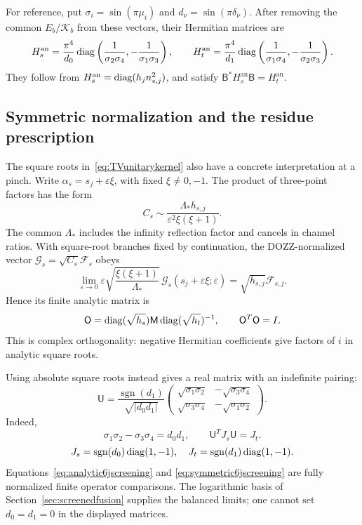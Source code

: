 For reference, put
$\sigma_i=\sin(\pi\mu_i)$ and
$d_\nu=\sin(\pi\delta_\nu)$. After removing the common
$E_b/\mathcal K_b$ from these vectors, their Hermitian matrices
are
\begin{equation}
 H_s^{\mathrm{an}}=
 \frac{\pi^4}{d_0}
 \operatorname{diag}\left(\frac1{\sigma_2\sigma_4},
            -\frac1{\sigma_1\sigma_3}\right),\qquad
 H_t^{\mathrm{an}}=
 \frac{\pi^4}{d_1}
 \operatorname{diag}\left(\frac1{\sigma_1\sigma_4},
            -\frac1{\sigma_2\sigma_3}\right).
 \label{eq:analytic6jpairing}
\end{equation}
They follow from $H_s^{\mathrm{an}}=\operatorname{diag}(h_jn_{s,j}^2)$,
and satisfy $\mathsf B^*H_s^{\mathrm{an}}\mathsf B
=H_t^{\mathrm{an}}$.

\subsection{Symmetric normalization and the residue prescription}

The square roots in~\eqref{eq:TVunitarykernel} also have a
concrete interpretation at a pinch. Write
$\alpha_s=s_j+\varepsilon\xi$, with fixed
$\xi\ne0,-1$. The product of three-point factors has the form
\[
 C_s\sim\frac{\Lambda_*h_{s,j}}
                {\varepsilon^2\xi(\xi+1)}.
\]
The common $\Lambda_*$ includes the infinity reflection factor
and cancels in channel ratios. With square-root branches fixed
by continuation, the DOZZ-normalized vector
$\mathcal G_s=\sqrt{C_s}\mathcal F_s$ obeys
\begin{equation}
 \lim_{\varepsilon\to0}
 \varepsilon\sqrt{\frac{\xi(\xi+1)}{\Lambda_*}}\,
 \mathcal G_s(s_j+\varepsilon\xi;\varepsilon)
       =\sqrt{h_{s,j}}\mathcal F_{s,j}.
 \label{eq:regularizedTVvector}
\end{equation}
Hence its finite analytic matrix is
\[
 \mathsf O=\operatorname{diag}(\sqrt{h_s})\mathsf M
                 \operatorname{diag}(\sqrt{h_t})^{-1},
 \qquad \mathsf O^T\mathsf O=I.
\]
This is complex orthogonality: negative Hermitian coefficients
give factors of $i$ in analytic square roots.

Using absolute square roots instead gives a real matrix with
an indefinite pairing:
\begin{equation}
 \boxed{\quad
 \mathsf U=
 \frac{\operatorname{sgn}(d_1)}{\sqrt{|d_0d_1|}}
 \begin{pmatrix}
 \sqrt{\sigma_1\sigma_2}&-\sqrt{\sigma_3\sigma_4}\\
 \sqrt{\sigma_3\sigma_4}&-\sqrt{\sigma_1\sigma_2}
 \end{pmatrix}.
 \quad}
 \label{eq:symmetric6jscreening}
\end{equation}
Indeed,
\[
 \sigma_1\sigma_2-\sigma_3\sigma_4=d_0d_1,\qquad
 \mathsf U^T J_s\mathsf U=J_t.
\]
\[
 J_s=\operatorname{sgn}(d_0)\operatorname{diag}(1,-1),\quad
 J_t=\operatorname{sgn}(d_1)\operatorname{diag}(1,-1).
\]
Equations~\eqref{eq:analytic6jscreening} and
\eqref{eq:symmetric6jscreening} are fully normalized finite
operator comparisons. The logarithmic basis of
Section~\ref{sec:screenedfusion} supplies the balanced limits;
one cannot set $d_0=d_1=0$ in the displayed matrices.

